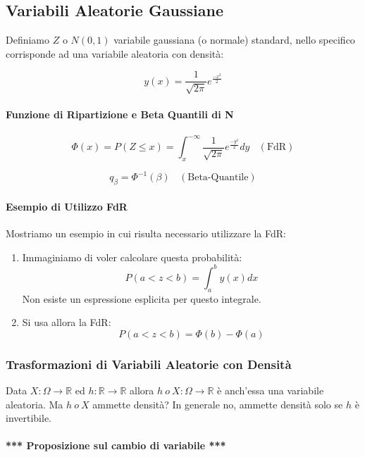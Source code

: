 \documentclass{article}
\begin{document}
\newpage

\subsection{Variabili Aleatorie Gaussiane}

Definiamo $Z$ o $N(0,1)$ variabile gaussiana (o normale) standard, nello specifico corrisponde ad una variabile aleatoria con densità:

\[ y(x) = \frac{1}{\sqrt{2\pi}}e^{\frac{-x^{2}}{2}} \]

\paragraph{Funzione di Ripartizione e Beta Quantili di N}

\[ \Phi(x) = P(Z \leq x) = \int_{x}^{-\infty} \frac{1}{\sqrt{2\pi}} e^{\frac{-y^{2}}{2}} dy \:\:\:\: (\text{FdR})\]

\[ q_{\beta} = \Phi^{-1}(\beta) \:\:\:\: (\text{Beta-Quantile})\]

\paragraph{Esempio di Utilizzo FdR} Mostriamo un esempio in cui risulta necessario utilizzare la FdR:

\begin{enumerate}
    \item Immaginiamo di voler calcolare questa probabilità:
    \[ P(a < z < b) = \int_{a}^{b} y(x)dx \]
    Non esiste un espressione esplicita per questo integrale.
    \item Si usa allora la FdR:
    \[ P(a < z < b) = \Phi(b) - \Phi(a) \]
\end{enumerate}

\subsubsection{Trasformazioni di Variabili Aleatorie con Densità}

Data $X:\Omega \rightarrow \mathbb{R}$ ed $h:\mathbb{R} \rightarrow \mathbb{R}$ allora $h \: o \:X : \Omega \rightarrow \mathbb{R}$ è anch'essa una variabile
aleatoria. Ma $h \: o \:X$ ammette densità? In generale no, ammette densità solo se $h$ è invertibile.

\paragraph{*** Proposizione sul cambio di variabile ***}
\end{document}
